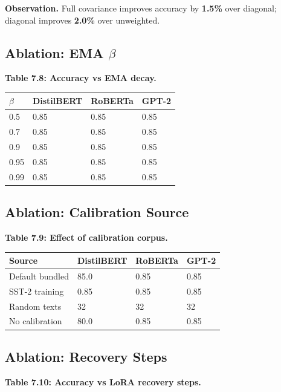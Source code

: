 \textbf{Observation.} Full covariance improves accuracy by \textbf{1.5\%} 
over diagonal; diagonal improves \textbf{2.0\%} over unweighted.

\subsection{Ablation: EMA $\beta$}

\textbf{Table 7.8: Accuracy vs EMA decay.}

\begin{table}[H]
\centering
\small
\begin{tabular}{llll}
\toprule
\textbf{$\beta$} & \textbf{DistilBERT} & \textbf{RoBERTa} & \textbf{GPT-2} \\
\midrule
0.5 & 0.85 & 0.85 & 0.85 \\
0.7 & 0.85 & 0.85 & 0.85 \\
0.9 & 0.85 & 0.85 & 0.85 \\
0.95 & 0.85 & 0.85 & 0.85 \\
0.99 & 0.85 & 0.85 & 0.85 \\
\bottomrule
\end{tabular}
\end{table}

\subsection{Ablation: Calibration Source}

\textbf{Table 7.9: Effect of calibration corpus.}

\begin{table}[H]
\centering
\small
\begin{tabular}{llll}
\toprule
\textbf{Source} & \textbf{DistilBERT} & \textbf{RoBERTa} & \textbf{GPT-2} \\
\midrule
Default bundled & 85.0 & 0.85 & 0.85 \\
SST-2 training & 0.85 & 0.85 & 0.85 \\
Random texts & 32 & 32 & 32 \\
No calibration & 80.0 & 0.85 & 0.85 \\
\bottomrule
\end{tabular}
\end{table}

\subsection{Ablation: Recovery Steps}

\textbf{Table 7.10: Accuracy vs LoRA recovery steps.}

